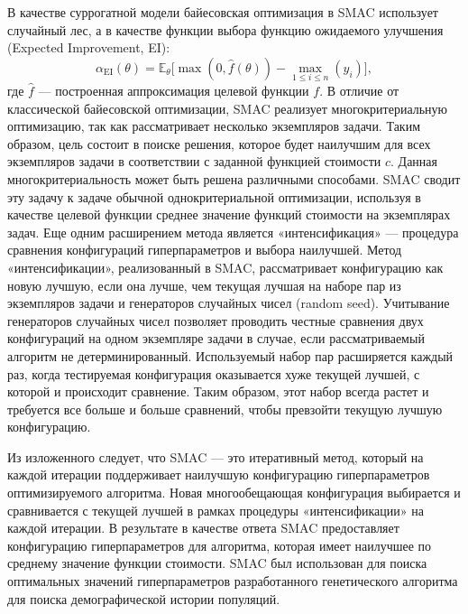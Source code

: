 В качестве суррогатной модели байесовская оптимизация в SMAC использует случайный лес, а в качестве функции выбора функцию ожидаемого улучшения (Expected Improvement, EI):
$$\alpha_{\mathrm{EI}}(\theta) = \mathbb{E}_\theta \bigl[\max(0, \hat{f}(\theta)) - \max_{1 \leq i \leq n}(y_i)\bigr],$$
где $\hat{f}$ --- построенная аппроксимация целевой функции $f$.
В отличие от классической байесовской оптимизации, SMAC реализует многокритериальную оптимизацию, так как рассматривает несколько экземпляров задачи.
Таким образом, цель состоит в поиске решения, которое будет наилучшим для всех экземпляров задачи в соответствии с заданной функцией стоимости $c$.
Данная многокритериальность может быть решена различными способами.
SMAC сводит эту задачу к задаче обычной однокритериальной оптимизации, используя в качестве целевой функции среднее значение функций стоимости на экземплярах задач.
Еще одним расширением метода является «интенсификация» --- процедура сравнения конфигураций гиперпараметров и выбора наилучшей.
Метод «интенсификации», реализованный в SMAC, рассматривает конфигурацию как новую лучшую, если она лучше, чем текущая лучшая на наборе пар из экземпляров задачи и генераторов случайных чисел (random seed).
Учитывание генераторов случайных чисел позволяет проводить честные сравнения двух конфигураций на одном экземпляре задачи в случае, если рассматриваемый алгоритм не детерминированный.
Используемый набор пар расширяется каждый раз, когда тестируемая конфигурация оказывается хуже текущей лучшей, с которой и происходит сравнение. 
Таким образом, этот набор всегда растет и требуется все больше и больше сравнений, чтобы превзойти текущую лучшую конфигурацию.

Из изложенного следует, что SMAC --- это итеративный метод, который на каждой итерации поддерживает наилучшую конфигурацию гиперпараметров оптимизируемого алгоритма.
Новая многообещающая конфигурация выбирается и сравнивается с текущей лучшей в рамках процедуры «интенсификации» на каждой итерации.
В результате в качестве ответа SMAC предоставляет конфигурацию гиперпараметров для алгоритма, которая имеет наилучшее по среднему значение функции стоимости.
SMAC был использован для поиска оптимальных значений гиперпараметров разработанного генетического алгоритма для поиска демографической истории популяций.

